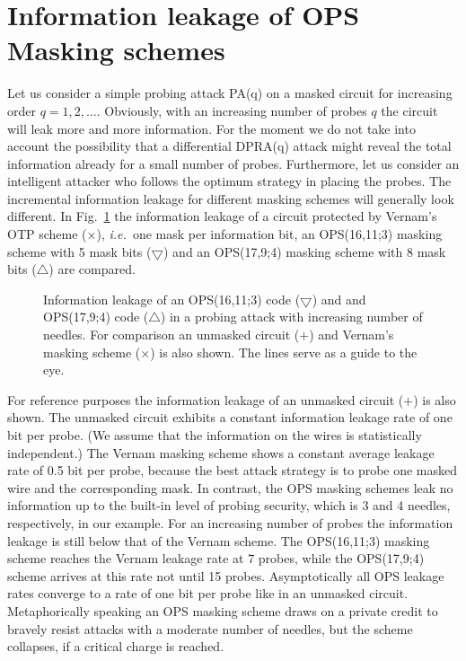 \documentclass[11pt]{llncs}
\newcommand{\ie}{{\it i.e.\ }}
\begin{document}
\section{Information leakage of OPS Masking schemes}\label{Sec:Leakage}
Let us consider a simple probing attack PA(q) on a masked circuit
for increasing order $q=1,2,\dots$.
Obviously, with an increasing number of probes $q$ the circuit
will leak more and more information.
For the moment we do not take into account the possibility that a differential
DPRA(q) attack might reveal the total information already for a small number of probes.
Furthermore, let us consider an intelligent attacker
who follows the optimum strategy in placing the probes.
The incremental information leakage for different masking schemes will
generally look different.
In Fig.~\ref{Fig:InformationLeakage} the information leakage of a circuit
protected by Vernam's OTP scheme ($\times$), \ie one mask per information bit,
an OPS(16,11;3) masking scheme with 5 mask bits ($\bigtriangledown$) and
an OPS(17,9;4) masking scheme with 8 mask bits ($\bigtriangleup$)
are compared.
\begin{figure}[thb]
\centering {}
\caption{Information leakage of an OPS(16,11;3) code ($\bigtriangledown$) and
         and OPS(17,9;4) code ($\bigtriangleup$)
         in a probing attack with increasing number of needles.
         For comparison an unmasked circuit ($+$)
         and Vernam's masking scheme ($\times$) is also shown.
         The lines serve as a guide to the eye.}
\label{Fig:InformationLeakage}
\end{figure}
For reference purposes the information leakage of an
unmasked circuit ($+$) is also shown. The unmasked circuit
exhibits a constant information leakage rate of one bit per probe.
(We assume that the information on the wires is statistically independent.)
The Vernam masking scheme shows a constant average leakage
rate of 0.5 bit per probe, because the best attack strategy is to probe
one masked wire and the corresponding mask.
In contrast, the OPS masking schemes leak no information up to
the built-in level of probing security,
which is 3 and 4 needles, respectively, in our example.
For an increasing number of probes the information leakage
is still below that of the Vernam scheme.
The OPS(16,11;3) masking scheme reaches the
Vernam leakage rate at 7 probes, while the OPS(17,9;4) scheme
arrives at this rate not until 15 probes.
Asymptotically all OPS leakage rates converge
to a rate of one bit per probe like in an unmasked circuit.
Metaphorically speaking an OPS masking scheme
draws on a private credit to bravely resist attacks with a
moderate number of needles, but the scheme collapses,
if a critical charge is reached.
\end{document}
